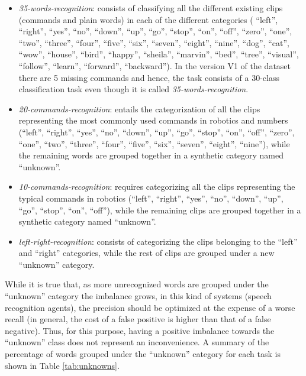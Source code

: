 \begin{itemize}
	\item \textit{35-words-recognition}: consists of classifying all the different existing clips (commands and plain words) in each of the different categories (
	``left'',
	``right'',
	``yes'',
	``no'',
	``down'',
	``up'',
	``go'',
	``stop'',
	``on'',
	``off'',
	``zero'',
	``one'',
	``two'',
	``three'',
	``four'',
	``five'',
	``six'',
	``seven'',
	``eight'',
	``nine'',
	``dog'',
	``cat'',
	``wow'',
	``house'',
	``bird'',
	``happy'',
	``sheila'',
	``marvin'',
	``bed'',
	``tree'',
	``visual'',
	``follow'',
	``learn'',
	``forward'',
	``backward''). In the version V1 of the dataset there are 5 missing commands and hence, the task consists of a 30-class classification task even though it is called \textit{35-words-recognition}.
	\item \textit{20-commands-recognition}: entails the categorization of all the clips representing the most commonly used commands in robotics \autocite{Warden2018} and numbers (``left'',
	``right'',
	``yes'',
	``no'',
	``down'',
	``up'',
	``go'',
	``stop'',
	``on'',
	``off'',
	``zero'',
	``one'',
	``two'',
	``three'',
	``four'',
	``five'',
	``six'',
	``seven'',
	``eight'',
	``nine''), while the remaining words are grouped together in a synthetic category named ``unknown''.
	\item \textit{10-commands-recognition}: requires categorizing all the clips representing the typical commands in robotics (``left'',
	``right'',
	``yes'',
	``no'',
	``down'',
	``up'',
	``go'',
	``stop'',
	``on'',
	``off''), while the remaining clips are grouped together in a synthetic category named ``unknown''.
	\item \textit{left-right-recognition}: consists of categorizing the clips belonging to the ``left'' and ``right'' categories, while the rest of clips are grouped under a new ``unknown'' category.
\end{itemize}


While it is true that, as more unrecognized words are grouped under the ``unknown'' category the imbalance grows, in this kind of systems (speech recognition agents), the precision should be optimized at the expense of a worse recall (in general, the cost of a false positive is higher than that of a false negative). Thus, for this purpose, having a positive imbalance towards the ``unknown'' class does not represent an inconvenience. A summary of the percentage of words grouped under the ``unknown'' category for each task is shown in Table \ref{tab:unknowns}.

